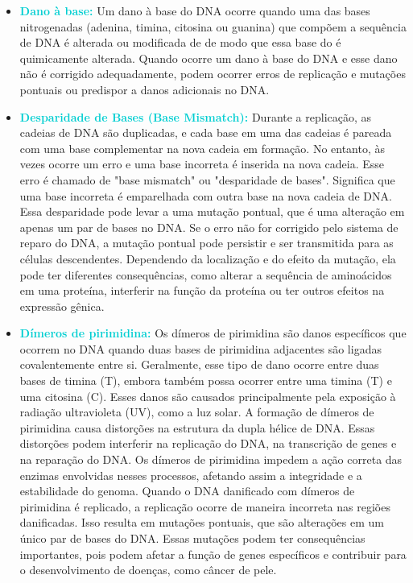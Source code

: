 \documentclass[11pt,a4paper]{article}
\begin{document}
	\begin{itemize}[label=\textcolor{CarnationPink}{$\blacktriangleright$}]
		\item \textcolor{DarkTurquoise}{\textbf{Dano à base: }} Um dano à base do DNA ocorre quando uma das bases nitrogenadas (adenina, timina, citosina ou guanina) que compõem a sequência de DNA é alterada ou modificada de de modo que essa base do é quimicamente alterada. Quando ocorre um dano à base do DNA e esse dano não é corrigido adequadamente, podem ocorrer erros de replicação e mutações pontuais ou predispor a danos adicionais no DNA.
		
		\item \textcolor{DarkTurquoise}{\textbf{Desparidade de Bases (Base Mismatch):}} Durante a replicação, as cadeias de DNA são duplicadas, e cada base em uma das cadeias é pareada com uma base complementar na nova cadeia em formação. No entanto, às vezes ocorre um erro e uma base incorreta é inserida na nova cadeia. Esse erro é chamado de "base mismatch" ou "desparidade de bases". Significa que uma base incorreta é emparelhada com outra base na nova cadeia de DNA. Essa desparidade pode levar a uma mutação pontual, que é uma alteração em apenas um par de bases no DNA. Se o erro não for corrigido pelo sistema de reparo do DNA, a mutação pontual pode persistir e ser transmitida para as células descendentes. Dependendo da localização e do efeito da mutação, ela pode ter diferentes consequências, como alterar a sequência de aminoácidos em uma proteína, interferir na função da proteína ou ter outros efeitos na expressão gênica.
		
		\item \textcolor{DarkTurquoise}{\textbf{Dímeros de pirimidina:}} Os dímeros de pirimidina são danos específicos que ocorrem no DNA quando duas bases de pirimidina adjacentes são ligadas covalentemente entre si. Geralmente, esse tipo de dano ocorre entre duas bases de timina (T), embora também possa ocorrer entre uma timina (T) e uma citosina (C). Esses danos são causados principalmente pela exposição à radiação ultravioleta (UV), como a luz solar. A formação de dímeros de pirimidina causa distorções na estrutura da dupla hélice de DNA. Essas distorções podem interferir na replicação do DNA, na transcrição de genes e na reparação do DNA. Os dímeros de pirimidina impedem a ação correta das enzimas envolvidas nesses processos, afetando assim a integridade e a estabilidade do genoma. Quando o DNA danificado com dímeros de pirimidina é replicado, a replicação ocorre de maneira incorreta nas regiões danificadas. Isso resulta em mutações pontuais, que são alterações em um único par de bases do DNA. Essas mutações podem ter consequências importantes, pois podem afetar a função de genes específicos e contribuir para o desenvolvimento de doenças, como câncer de pele.

	\end{itemize}



\end{document}
